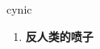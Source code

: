 
\begin{frame}
{\huge cynic}
\begin{center}
\begin{enumerate}\Large
  \item \textbf{反人类的喷子}
\end{enumerate}
\end{center}
\end{frame}
